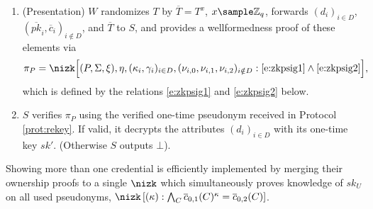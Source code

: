 \documentclass[runningheads]{llncs}
\newcommand{\Z}{\mathbb{Z}}
\DeclareMathOperator{\COM}{\ensuremath{\mathsf{COM}}}
\begin{document}
\begin{definition}
\begin{enumerate}
\item 
(Presentation)
$W$ randomizes $T$ by $\overline T = T^x$, $x\sample\Z_q$, %
forwards $ \left(d_i \right)_{i\in D}$,  $\left( \overline{pk}_i, \overline c_i\right)_{i \notin D}$, and $\overline T$ to $S$, and provides a wellformedness proof of these elements via
\begin{align*}
\pi_P= \nizk\Big[
(P, \Sigma, \xi), \eta,  (\kappa_{i}, \gamma_{i})_{i\in D}, (\nu_{i,0}, \nu_{i,1}, \nu_{i,2})_{i\notin D}
:
\text{\eqref{e:zkpsig1}} \wedge
\text{\eqref{e:zkpsig2}} %
\Big],
\end{align*}
which is defined by the relations \eqref{e:zkpsig1} and \eqref{e:zkpsig2} below.



\item
$S$ verifies $\pi_P$ using the verified one-time pseudonym received in Protocol \ref{prot:rekey}.
If valid, it decrypts the attributes  $\left(d_i\right)_{i\in D}$ with its one-time key $sk'$.
(Otherwise $S$ outputs $\bot$).
\end{enumerate}
\end{definition}

\begin{remark}
\label{rem:multishow}
Showing more than one credential is efficiently implemented by merging their ownership proofs to a single $\nizk$ which simultaneously proves knowledge of $sk_U$ on all used pseudonyms, $\nizk \left[ (\kappa) : \bigwedge_{C} \overline  c_{0,1}(C)^\kappa = \overline c_{0,2}(C)\right]$.
\end{remark}
\end{document}
